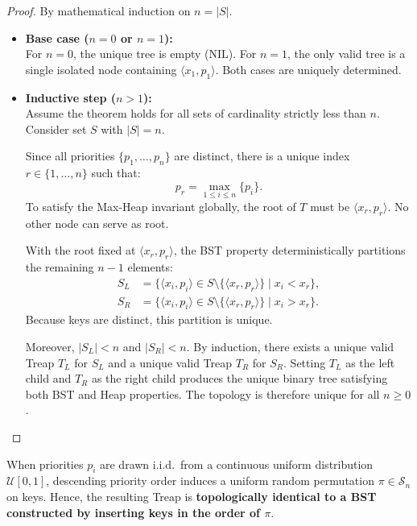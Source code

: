 \begin{proof}
By mathematical induction on $n = |S|$.
\begin{itemize}
    \item \textbf{Base case ($n = 0$ or $n = 1$):}\\
    For $n = 0$, the unique tree is empty (NIL). For $n = 1$, the only valid tree is a single isolated node containing $\langle x_1, p_1 \rangle$. Both cases are uniquely determined.

    \item \textbf{Inductive step ($n > 1$):}\\
    Assume the theorem holds for all sets of cardinality strictly less than $n$. Consider set $S$ with $|S| = n$.
    
    Since all priorities $\{p_1, \dots, p_n\}$ are distinct, there is a unique index $r \in \{1, \dots, n\}$ such that:
    \begin{equation}
      p_r = \max_{1 \le i \le n} \{ p_i \}.
    \end{equation}
    To satisfy the Max-Heap invariant globally, the root of $T$ must be $\langle x_r, p_r \rangle$. No other node can serve as root.

    With the root fixed at $\langle x_r, p_r \rangle$, the BST property deterministically partitions the remaining $n - 1$ elements:
    \begin{align}
      S_L &= \{ \langle x_i, p_i \rangle \in S \setminus \{\langle x_r, p_r \rangle\} \mid x_i < x_r \}, \\
      S_R &= \{ \langle x_i, p_i \rangle \in S \setminus \{\langle x_r, p_r \rangle\} \mid x_i > x_r \}.
    \end{align}
    Because keys are distinct, this partition is unique.
    
    Moreover, $|S_L| < n$ and $|S_R| < n$. By induction, there exists a unique valid Treap $T_L$ for $S_L$ and a unique valid Treap $T_R$ for $S_R$. Setting $T_L$ as the left child and $T_R$ as the right child produces the unique binary tree satisfying both BST and Heap properties. The topology is therefore unique for all $n \ge 0$.
\end{itemize}
\end{proof}

\begin{corollary}
When priorities $p_i$ are drawn i.i.d.\ from a continuous uniform distribution $\mathcal{U}[0, 1]$, descending priority order induces a uniform random permutation $\pi \in \mathcal{S}_n$ on keys. Hence, the resulting Treap is \textbf{topologically identical to a BST constructed by inserting keys in the order of $\pi$}.
\end{corollary}

